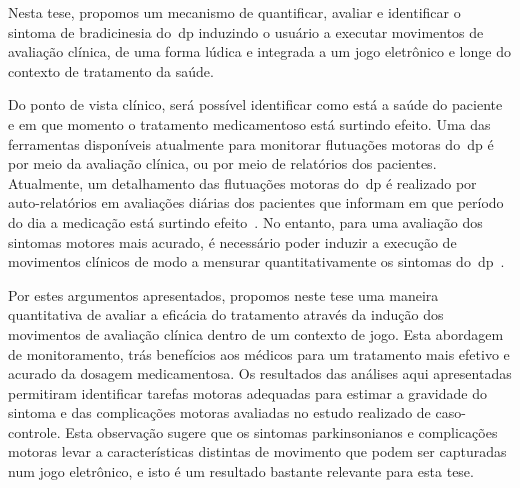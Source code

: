 Nesta tese, propomos um mecanismo de quantificar, avaliar e identificar o sintoma de bradicinesia do~\ac{dp} induzindo o usuário a executar movimentos de avaliação clínica, de uma forma lúdica e integrada a um jogo eletrônico e longe do contexto de tratamento da saúde.

Do ponto de vista clínico, será possível identificar como está a saúde do paciente e em que momento o tratamento medicamentoso está surtindo efeito. Uma das ferramentas disponíveis atualmente para monitorar flutuações motoras do~\ac{dp} é por meio da avaliação clínica, ou por meio de relatórios dos pacientes. Atualmente, um detalhamento das flutuações motoras do~\ac{dp} é realizado por auto-relatórios em avaliações diárias dos pacientes que informam em que período do dia a medicação está surtindo efeito~\cite{reviewassesenspark2015}. No entanto, para uma avaliação dos sintomas motores mais acurado, é necessário poder induzir a execução de movimentos clínicos de modo a mensurar quantitativamente os sintomas do~\ac{dp}~\cite{wiiassesspark2016}.

Por estes argumentos apresentados, propomos neste tese uma maneira quantitativa de avaliar a eficácia do tratamento através da indução dos movimentos de avaliação clínica dentro de um contexto de jogo. Esta abordagem de monitoramento, trás benefícios aos médicos para um tratamento mais efetivo e acurado da dosagem medicamentosa. Os resultados das análises aqui apresentadas permitiram identificar tarefas motoras adequadas para estimar a gravidade do sintoma e das complicações motoras avaliadas no estudo realizado de caso-controle. Esta observação sugere que os sintomas parkinsonianos e complicações motoras levar a características distintas de movimento que podem ser capturadas num jogo eletrônico, e isto é um resultado bastante relevante para esta tese.



